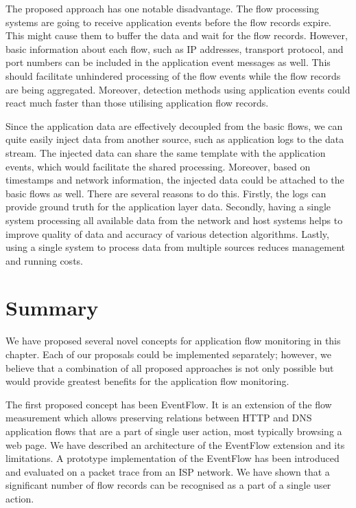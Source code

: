 The proposed approach has one notable disadvantage. The flow processing systems are going to receive application events before the flow records expire. This might cause them to buffer the data and wait for the flow records. However, basic information about each flow, such as IP addresses, transport protocol, and port numbers can be included in the application event messages as well. This should facilitate unhindered processing of the flow events while the flow records are being aggregated. Moreover, detection methods using application events could react much faster than those utilising application flow records.

Since the application data are effectively decoupled from the basic flows, we can quite easily inject data from another source, such as application logs to the data stream. The injected data can share the same template with the application events, which would facilitate the shared processing. Moreover, based on timestamps and network information, the injected data could be attached to the basic flows as well. There are several reasons to do this. Firstly, the logs can provide ground truth for the application layer data. Secondly, having a single system processing all available data from the network and host systems helps to improve quality of data and accuracy of various detection algorithms. Lastly, using a single system to process data from multiple sources reduces management and running costs.

\section{Summary}\label{sec:ng-summary}

We have proposed several novel concepts for application flow monitoring in this chapter. Each of our proposals could be implemented separately; however, we believe that a combination of all proposed approaches is not only possible but would provide greatest benefits for the application flow monitoring.

The first proposed concept has been EventFlow. It is an extension of the flow measurement which allows preserving relations between HTTP and DNS application flows that are a part of single user action, most typically browsing a web page. We have described an architecture of the EventFlow extension and its limitations. A prototype implementation of the EventFlow has been introduced and evaluated on a packet trace from an ISP network. We have shown that a significant number of flow records can be recognised as a part of a single user action.

